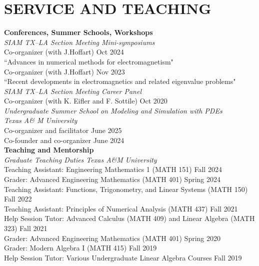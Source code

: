 \documentclass[10pt,a4paper,roman]{moderncv}
\begin{document}
 
\section{SERVICE AND TEACHING}
\textbf{Conferences, Summer Schools, Workshops}\\

\textit{SIAM TX–LA Section Meeting Mini-symposiums}\\
Co-organizer (with J.Hoffart) \hfill Oct 2024\\
``Advances in numerical methods for electromagnetism" \\
Co-organizer (with J.Hoffart) \hfill Nov 2023 \\
``Recent developments in electromagnetics and related eigenvalue problems" \\

\textit{SIAM TX–LA Section Meeting Career Panel}\\
Co-organizer (with K. Eifler and F. Sottile) \hfill Oct 2020\\

\textit{Undergraduate Summer School on Modeling and Simulation with PDEs}\\
\textit{Texas A\& M University} \\
Co-organizer and facilitator \hfill June 2025\\
Co-founder and co-organizer \hfill June 2024\\


\textbf{Teaching and Mentorship}\\

\textit{Graduate Teaching Duties Texas A\&M University}\\
Teaching Assistant: Engineering Mathematics 1 (MATH 151) \hfill Fall 2024\\
Grader: Advanced Engineering Mathematics (MATH 401) \hfill Spring 2024\\
Teaching Assistant: Functions, Trigonometry, and Linear Systems (MATH 150) \hfill Fall 2022\\
Teaching Assistant: Principles of Numerical Analysis (MATH 437) \hfill Fall 2021\\
Help Session Tutor: Advanced Calculus (MATH 409) and Linear Algebra (MATH 323) \hfill Fall 2021\\
Grader: Advanced Engineering Mathematics (MATH 401) \hfill Spring 2020\\
Grader: Modern Algebra I (MATH 415) \hfill Fall 2019\\
Help Session Tutor: Various Undergraduate Linear Algebra Courses \hfill Fall 2019\\
\end{document}
